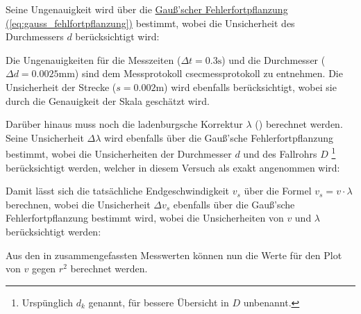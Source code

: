 Seine Ungenauigkeit wird über die \hyperref[eq:gauss_fehlfortpflanzung]{Gauß'scher Fehlerfortpflanzung (\ref*{eq:gauss_fehlfortpflanzung})} bestimmt, wobei die Unsicherheit des Durchmessers \(d\) berücksichtigt wird:

Die Ungenauigkeiten für die Messzeiten (\(\Delta t = {0.3} \mathrm{s}\)) und die Durchmesser (\(\Delta d = {0.0025} \mathrm{mm}\)) sind dem Messprotokoll csec{messprotokoll} zu entnehmen. Die Unsicherheit der Strecke (\(s = {0.002} \mathrm{m}\)) wird ebenfalls berücksichtigt, wobei sie durch die Genauigkeit der Skala geschätzt wird.

Darüber hinaus muss noch die ladenburgsche Korrektur \(\lambda\) () berechnet werden. Seine Unsicherheit \(\Delta \lambda\) wird ebenfalls über die Gauß'sche Fehlerfortpflanzung bestimmt, wobei die Unsicherheiten der Durchmesser \(d\) und des Fallrohrs \(D\) \footnote{Urspünglich $d_k$ genannt, für bessere Übersicht in $D$ unbenannt.} berücksichtigt werden, welcher in diesem Versuch als exakt angenommen wird:


Damit lässt sich die tatsächliche Endgeschwindigkeit \(v_s\) über die Formel \(v_s = v \cdot \lambda\) berechnen, wobei die Unsicherheit \(\Delta v_s\) ebenfalls über die Gauß'sche Fehlerfortpflanzung bestimmt wird, wobei die Unsicherheiten von \(v\) und \(\lambda\) berücksichtigt werden:

Aus den in  zusammengefassten Messwerten können nun die Werte für den Plot von \(v\) gegen \(r^2\) berechnet werden.

